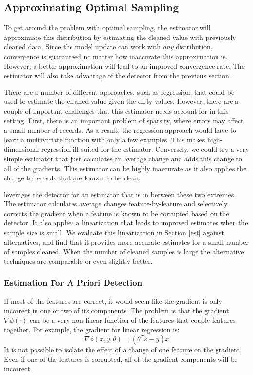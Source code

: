 \subsection{Approximating Optimal Sampling}\label{sampling}
To get around the problem with optimal sampling, the estimator will approximate this distribution by estimating the cleaned value with previously cleaned data.
Since the model update can work with \emph{any} distribution, convergence is guaranteed no matter how inaccurate this approximation is.
However, a better approximation will lead to an improved convergence rate.
The estimator will also take advantage of the detector from the previous section.

There are a number of different approaches, such as regression, that could be used to estimate the cleaned value given the dirty values.
However, there are a couple of important challenges that this estimator needs account for in this setting. 
First, there is an important problem of sparsity, where errors may affect a small number of records.
As a result, the regression approach would have to learn a multivariate function with only a few examples.
This makes high-dimensional regression ill-suited for the estimator.
Conversely, we could try a very simple estimator that just calculates an average change and adds this change to all of the gradients.
This estimator can be highly inaccurate as it also applies the change to records that are known to be clean.

\sys leverages the detector for an estimator that is in between these two extremes.
The estimator calculates average changes feature-by-feature and selectively corrects the gradient when a feature is known to be corrupted based on the detector.
It also applies a linearization that leads to improved estimates when the sample size is small.
We evaluate this linearization in Section \ref{est} against alternatives, and find that it provides more accurate estimates for a small number of samples cleaned.
When the number of cleaned samples is large the alternative techniques are comparable or even slightly better.

\subsubsection{Estimation For A Priori Detection}
If most of the features are correct, it would seem like the gradient is only
incorrect in one or two of its components.
The problem is that the gradient $\nabla\phi(\cdot)$ can be a very non-linear function of the features that couple features together.
For example, the gradient for linear regression is:
\[
\nabla\phi(x,y,\theta) = (\theta^Tx - y)x
\]
It is not possible to isolate the effect of a change of one feature on the gradient.
Even if one of the features is corrupted, all of the gradient components will be incorrect.

